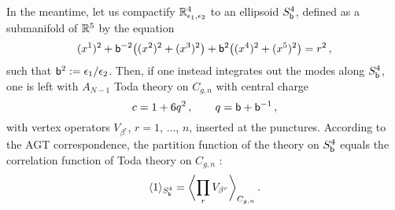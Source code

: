 

\begin{comment}
The AGT correspondence originates from six-dimensional $\CN = (2,0)$
supersymmetric field theory, of type $A_{N-1}$ in our case, placed on
$S^4_\bs \times C_{g,n}$.  Here, $S^4_\bs$ is an ellipsoid, defined as
a submanifold of $\R^5$ by the equation
\begin{equation}
  (x^1)^2
  + \bs^{-2} \bigl((x^2)^2 + (x^3)^2\bigr)
  + \bs^2 \bigl((x^4)^2 + (x^5)^2\bigr)
  = r^2 \,,
\end{equation}
and $C_{g,n}$ is a Riemann surface of genus $g$ with $n$ punctures.
With partial topological twisting along $C_{g,n}$, this system
preserves eight of the sixteen supercharges of $\CN = (2,0)$
supersymmetry in six dimensions.
\end{comment}



In the meantime, let us compactify $\mathbb{R}^4_{\epsilon_1,\epsilon_2}$ to an ellipsoid $S^4_{\mathsf{b}}$,
defined as a submanifold of $\mathbb{R}^5$ by the equation
\begin{equation}
  (x^1)^2
  + \mathsf{b}^{-2} \bigl((x^2)^2 + (x^3)^2\bigr)
  + \mathsf{b}^2 \bigl((x^4)^2 + (x^5)^2\bigr)
  = r^2 \,,
\end{equation}
such that $\mathsf{b}^2 :=\epsilon_1/\epsilon_2$.
Then, if one instead integrates out the modes along $S^4_{\mathsf{b}}$, one is left
with $A_{N-1}$ Toda theory on $C_{g,n}$ with central charge
\begin{equation}
  c = 1 + 6q^2 \,,
  \qquad
  q = \mathsf{b} + \mathsf{b}^{-1} \,,
\end{equation}
with vertex operators $V_{\beta^r}$, $r = 1$, $\dotsc$, $n$, inserted
at the punctures.  According to the AGT correspondence, the partition
function of the theory on $S^4_{\mathsf{b}}$ equals the correlation function of
Toda theory on $C_{g,n}$ \cite{Hama:2011ea,Hama:2012bg}:
\begin{equation}
  \langle 1 \rangle_{S^4_{\mathsf{b}}} = \biggl\langle \prod_r V_{\beta^r} \biggr\rangle_{C_{g,n}} \,.
\end{equation}

